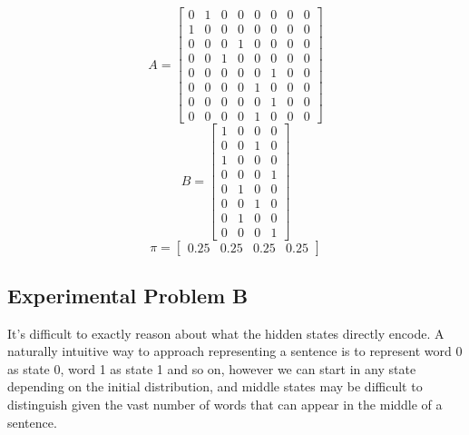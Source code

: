 \noindent
\begin{multicols}{3}

    \begin{equation*}
        A = \begin{bmatrix}
            0 & 1 & 0 & 0 & 0 & 0 & 0 & 0 \\
            1 & 0 & 0 & 0 & 0 & 0 & 0 & 0 \\
            0 & 0 & 0 & 1 & 0 & 0 & 0 & 0 \\
            0 & 0 & 1 & 0 & 0 & 0 & 0 & 0 \\
            0 & 0 & 0 & 0 & 0 & 1 & 0 & 0 \\
            0 & 0 & 0 & 0 & 1 & 0 & 0 & 0 \\
            0 & 0 & 0 & 0 & 0 & 1 & 0 & 0 \\
            0 & 0 & 0 & 0 & 1 & 0 & 0 & 0
        \end{bmatrix}
    \end{equation*}
    \break
    \noindent
    \begin{equation*}
        B = \begin{bmatrix}
            1 & 0 & 0 & 0 \\
            0 & 0 & 1 & 0 \\
            1 & 0 & 0 & 0 \\
            0 & 0 & 0 & 1 \\
            0 & 1 & 0 & 0 \\
            0 & 0 & 1 & 0 \\
            0 & 1 & 0 & 0 \\
            0 & 0 & 0 & 1
        \end{bmatrix}
    \end{equation*}
    \break
    \noindent
    \begin{equation*}
        \pi = \begin{bmatrix}
            0.25 & 0.25 & 0.25 & 0.25
        \end{bmatrix}
    \end{equation*}
\end{multicols}


\subsection*{Experimental Problem B}

It's difficult to exactly reason about what the hidden states directly encode. A naturally intuitive way to approach representing a sentence is to represent word 0 as state 0, word 1 as state 1 and so on, however we can start in any state depending on the initial distribution, and middle states may be difficult to distinguish given the vast number of words that can appear in the middle of a sentence.

